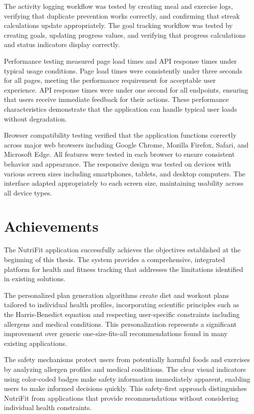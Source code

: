 The activity logging workflow was tested by creating meal and exercise logs, verifying that duplicate prevention works correctly, and confirming that streak calculations update appropriately. The goal tracking workflow was tested by creating goals, updating progress values, and verifying that progress calculations and status indicators display correctly.

Performance testing measured page load times and API response times under typical usage conditions. Page load times were consistently under three seconds for all pages, meeting the performance requirement for acceptable user experience. API response times were under one second for all endpoints, ensuring that users receive immediate feedback for their actions. These performance characteristics demonstrate that the application can handle typical user loads without degradation.

Browser compatibility testing verified that the application functions correctly across major web browsers including Google Chrome, Mozilla Firefox, Safari, and Microsoft Edge. All features were tested in each browser to ensure consistent behavior and appearance. The responsive design was tested on devices with various screen sizes including smartphones, tablets, and desktop computers. The interface adapted appropriately to each screen size, maintaining usability across all device types.

\section{Achievements}

The NutriFit application successfully achieves the objectives established at the beginning of this thesis. The system provides a comprehensive, integrated platform for health and fitness tracking that addresses the limitations identified in existing solutions.

The personalized plan generation algorithms create diet and workout plans tailored to individual health profiles, incorporating scientific principles such as the Harris-Benedict equation and respecting user-specific constraints including allergens and medical conditions. This personalization represents a significant improvement over generic one-size-fits-all recommendations found in many existing applications.

The safety mechanisms protect users from potentially harmful foods and exercises by analyzing allergen profiles and medical conditions. The clear visual indicators using color-coded badges make safety information immediately apparent, enabling users to make informed decisions quickly. This safety-first approach distinguishes NutriFit from applications that provide recommendations without considering individual health constraints.

